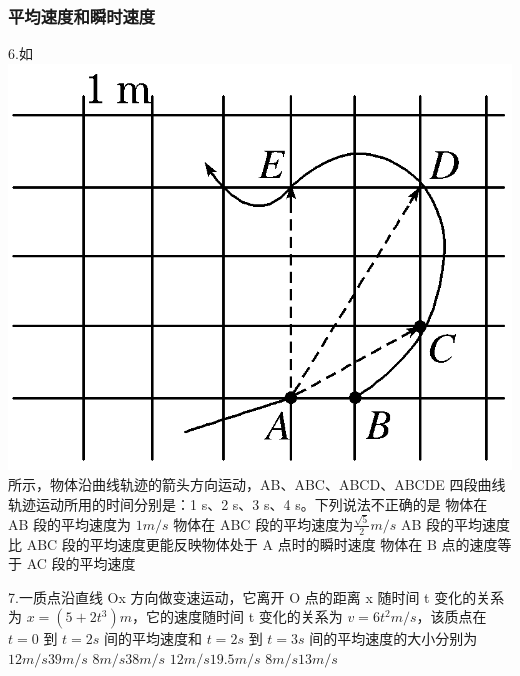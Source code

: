 \documentclass[a4paper,fontset = windows]{ctexbook} %
\begin{document}
\subsubsection{平均速度和瞬时速度}

\begin{xuanze}
   6.如
   \includegraphics{../picture/1-1/002.png}
   所示，物体沿曲线轨迹的箭头方向运动，AB、ABC、ABCD、ABCDE 四段曲线轨迹运动所用的时间分别是：1 s、2 s、3 s、4 s。下列说法不正确的是
   \choice[A]物体在 AB 段的平均速度为 $1 m/s$
   \choice[B]物体在 ABC 段的平均速度为$ \tfrac{\sqrt{5}}{2} m/s$
   \choice[C]AB 段的平均速度比 ABC 段的平均速度更能反映物体处于 A 点时的瞬时速度
   \choice[D]物体在 B 点的速度等于 AC 段的平均速度

   7.一质点沿直线 Ox 方向做变速运动，它离开 O 点的距离 x 随时间 t 变化的关系为 $x=(5+2t^3)m$，它的速度随时间 t 变化的关系为 $v=6t^2m/s$，该质点在 $t=0$ 到 $t=2 s$ 间的平均速度和 $t=2 s$ 到 $t=3 s$ 间的平均速度的大小分别为
   \choice[A] $12 m/s$\quad $39 m/s$
   \choice[B] $8 m/s$\quad $38 m/s$
   \choice[C] $12 m/s$\quad  $19.5 m/s$
   \choice[D] $8 m/s$\quad $13 m/s$

\end{xuanze}
\end{document}
